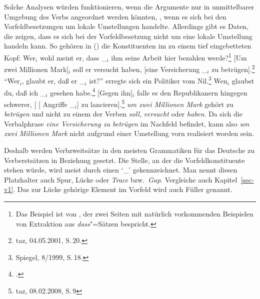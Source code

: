 Solche Analysen würden funktionieren, wenn die Argumente nur in unmittelbarer Umgebung des Verbs angeordnet
werden könnten, \dash, wenn es sich bei den Vorfeldbesetzungen um lokale Umstellungen handelte.
Allerdings gibt es Daten, die zeigen, dass es sich bei der Vorfeldbesetzung nicht um eine lokale Umstellung handeln kann.
So gehören in () die Konstituenten im \vf zu einem tief eingebetteten Kopf:
\eal
\ex 
Wer$_i$ wohl    meint   er, dass \_$_i$ ihm seine Arbeit hier bezahlen werde?\footnote{
Das Beispiel ist von \citet[]{Paul1919a}, der zwei Seiten mit natürlich vorkommenden
Beispielen von Extraktion aus \emph{dass}"=Sätzen bespricht.
}
\ex\label{bsp-um-zwei-millionen}
{}[Um zwei Millionen Mark]$_i$ soll er versucht haben, [eine Versicherung \_$_i$ zu betrügen].\footnote{
         taz, 04.05.2001, S.\,20.
}
\ex
"`Wer$_i$, glaubt er, daß er \_$_i$ ist?"' erregte sich ein Politiker vom Nil.\footnote{
        Spiegel, 8/1999, S.\,18.
}
\ex Wen$_i$ glaubst du, daß ich \_$_i$ gesehen habe.\footnote{
    .
    }
\ex {}[Gegen ihn]$_i$ falle es den Republikanern hingegen schwerer, [ [ Angriffe \_$_i$] zu lancieren].\footnote{
  taz, 08.02.2008, S.\,9
}
\zl
\emph{um zwei Millionen Mark} gehört zu \emph{betrügen} und nicht zu einem der Verben \emph{soll}, \emph{versucht}
oder \emph{haben}. Da sich die Verbalphrase \emph{eine Versicherung zu betrügen} im Nachfeld befindet, kann
also \emph{um zwei Millionen Mark} nicht aufgrund einer Umstellung vorn realisiert worden sein.

Deshalb werden Verbzweitsätze in den meisten Grammatiken für das Deutsche zu Verberstsätzen in Beziehung gesetzt.
Die Stelle, an der die Vorfeldkonstituente stehen würde, wird meist durch einen `\_' gekennzeichnet. Man nennt
diesen Platzhalter auch Spur, Lücke oder \emph{Trace} bzw.\ \emph{Gap}.
Vergleiche auch Kapitel~\ref{sec-v1}. Das zur Lücke gehörige Element im Vorfeld wird auch Füller genannt.

